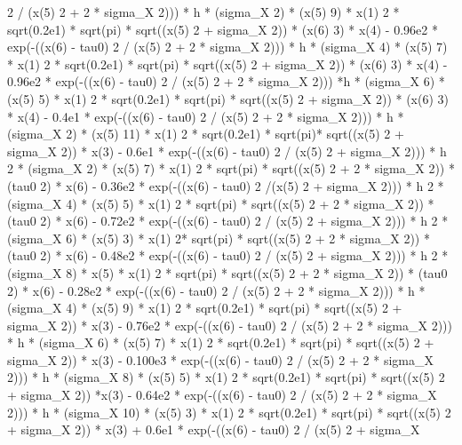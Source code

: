 \begin{maplegroup}
 2 / (x(5)  2 + 2 * sigma\_X  2))) * h * (sigma\_X  2) * (x(5)  9) * x(1)  2 * sqrt(0.2e1) * sqrt(pi) * sqrt((x(5)  2 + sigma\_X  2)) * (x(6)  3) * x(4) - 0.96e2 * exp(-((x(6) - tau0)  2 / (x(5)  2 + 2 * sigma\_X  2))) * h * (sigma\_X  4) * (x(5)  7) * x(1)  2 * sqrt(0.2e1) * sqrt(pi) * sqrt((x(5)  2 + sigma\_X  2)) * (x(6)  3) * x(4) - 0.96e2 * exp(-((x(6) - tau0)  2 / (x(5)  2 + 2 * sigma\_X  2))) *h * (sigma\_X  6) * (x(5)  5) * x(1)  2 * sqrt(0.2e1) * sqrt(pi) * sqrt((x(5)  2 + sigma\_X  2)) * (x(6)  3) * x(4) - 0.4e1 * exp(-((x(6) - tau0)  2 / (x(5)  2 + 2 * sigma\_X  2))) * h * (sigma\_X  2) * (x(5)  11) * x(1)  2 * sqrt(0.2e1) * sqrt(pi)* sqrt((x(5)  2 + sigma\_X  2)) * x(3) - 0.6e1 * exp(-((x(6) - tau0)  2 / (x(5)  2 + sigma\_X  2))) * h  2 * (sigma\_X  2) * (x(5)  7) * x(1)  2 * sqrt(pi) * sqrt((x(5)  2 + 2 * sigma\_X  2)) * (tau0  2) * x(6) - 0.36e2 * exp(-((x(6) - tau0)  2 /(x(5)  2 + sigma\_X  2))) * h  2 * (sigma\_X  4) * (x(5)  5) * x(1)  2 * sqrt(pi) * sqrt((x(5)  2 + 2 * sigma\_X  2)) * (tau0  2) * x(6) - 0.72e2 * exp(-((x(6) - tau0)  2 / (x(5)  2 + sigma\_X  2))) * h  2 * (sigma\_X  6) * (x(5)  3) * x(1)  2* sqrt(pi) * sqrt((x(5)  2 + 2 * sigma\_X  2)) * (tau0  2) * x(6) - 0.48e2 * exp(-((x(6) - tau0)  2 / (x(5)  2 + sigma\_X  2))) * h  2 * (sigma\_X  8) * x(5) * x(1)  2 * sqrt(pi) * sqrt((x(5)  2 + 2 * sigma\_X  2)) * (tau0  2) * x(6) - 0.28e2 * exp(-((x(6) - tau0)  2 / (x(5)  2 + 2 * sigma\_X  2))) * h * (sigma\_X  4) * (x(5)  9) * x(1)  2 * sqrt(0.2e1) * sqrt(pi) * sqrt((x(5)  2 + sigma\_X  2)) * x(3) - 0.76e2 * exp(-((x(6) - tau0)  2 / (x(5)  2 + 2 * sigma\_X  2))) * h * (sigma\_X  6) * (x(5)  7) * x(1)  2 * sqrt(0.2e1) * sqrt(pi) * sqrt((x(5)  2 + sigma\_X  2)) * x(3) - 0.100e3 * exp(-((x(6) - tau0)  2 / (x(5)  2 + 2 * sigma\_X  2))) * h * (sigma\_X  8) * (x(5)  5) * x(1)  2 * sqrt(0.2e1) * sqrt(pi) * sqrt((x(5)  2 + sigma\_X  2)) *x(3) - 0.64e2 * exp(-((x(6) - tau0)  2 / (x(5)  2 + 2 * sigma\_X  2))) * h * (sigma\_X  10) * (x(5)  3) * x(1)  2 * sqrt(0.2e1) * sqrt(pi) * sqrt((x(5)  2 + sigma\_X  2)) * x(3) + 0.6e1 * exp(-((x(6) - tau0)  2 / (x(5)  2 + sigma\_X 
\end{maplegroup}
